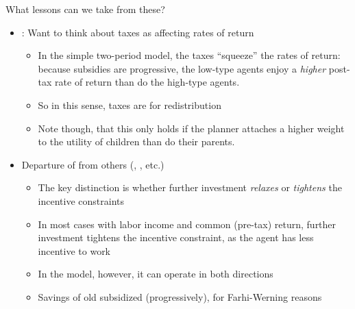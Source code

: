 \documentclass[11pt]{article}
\begin{document}
What lessons can we take from these? 
\begin{itemize}
    \item \cite{farhi2010progressive}: Want to think about taxes as affecting rates of return 
    \begin{itemize}
        \item In the simple two-period model, the taxes ``squeeze'' the rates of return: because subsidies are progressive, the low-type agents enjoy a \textit{higher} post-tax rate of return than do the high-type agents. 
        \item So in this sense, taxes are for redistribution 
        \item Note though, that this only holds if the planner attaches a higher weight to the utility of children than do their parents. 
    \end{itemize} 
    \item Departure of \cite{shourideh2014optimal} from others (\cite{golosov2003optimal}, \cite{albanesi2006dynamic}, etc.)
    \begin{itemize}
        \item The key distinction is whether further investment \textit{relaxes} or \textit{tightens} the incentive constraints 
        \item In most cases with labor income and common (pre-tax) return, further investment tightens the incentive constraint, as the agent has less incentive to work 
        \item In the \cite{shourideh2014optimal} model, however, it can operate in both directions 
        \item Savings of old subsidized (progressively), for Farhi-Werning reasons
    \end{itemize}
\end{itemize}



\end{document}
